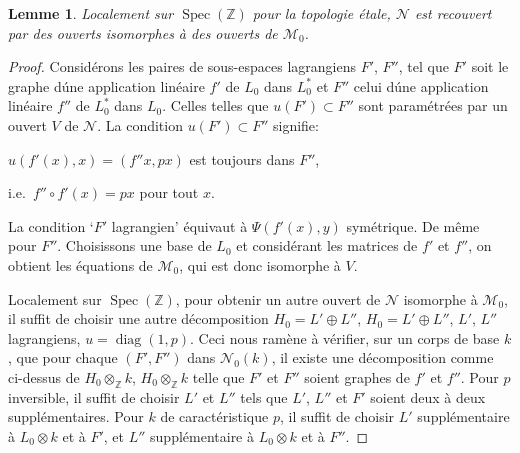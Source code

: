 \documentclass[11pt,a4paper]{article}
\theoremstyle{plain}
\newtheorem{lemma}[theorem]{Lemme}
\theoremstyle{definition}
\DeclareMathOperator{\Spec}{Spec}
\DeclareMathOperator{\diag}{diag}
\begin{document}
\begin{lemma}
Localement sur $\Spec(\mathbb{Z})$ pour la topologie \'etale, $\mathscr{N}$ est recouvert
par des ouverts isomorphes \`a des ouverts de $\mathscr{M}_0$.
\end{lemma}

\begin{proof}
Consid\'erons les paires de sous-espaces lagrangiens $F'$, $F''$, tel que $F'$
soit le graphe d\'une application lin\'eaire $f'$ de $L_0$ dans $L_0^*$ et $F''$ celui d\'une
application lin\'eaire $f''$ de $L_0^*$ dans $L_0$. Celles telles que $u(F') \subset F''$ sont
param\'etr\'ees par un ouvert $V$ de $\mathscr{N}$. La condition $u(F') \subset F''$ signifie:

$u(f'(x), x) = (f''x, px)$ est toujours dans $F''$,

i.e.~$f'' \circ f'(x) = px$ pour tout $x$.

La condition `$F'$ lagrangien' \'equivaut \`a $\Psi(f'(x), y)$ sym\'etrique. De m\^eme
pour $F''$. Choisissons une base de $L_0$ et consid\'erant les matrices de $f'$ et $f''$, on
obtient les \'equations de $\mathscr{M}_0$, qui est donc isomorphe \`a $V$.

Localement sur $\Spec(\mathbb{Z})$, pour obtenir un autre ouvert de $\mathscr{N}$ isomorphe \`a
$\mathscr{M}_0$, il suffit de choisir une autre d\'ecomposition $H_0 = L' \oplus L''$, $H_0 = L' \oplus L''$,
$L'$, $L''$ lagrangiens, $u = \diag(1, p)$. Ceci nous ram\`ene \`a v\'erifier, sur un corps de
base $k$, que pour chaque $(F', F'')$ dans $\mathscr{N}_0(k)$, il existe une d\'ecomposition
comme ci-dessus de $H_0 \otimes_\mathbb{Z} k$, $H_0 \otimes_\mathbb{Z} k$ telle que $F'$ et $F''$ soient graphes de $f'$ et
$f''$. Pour $p$ inversible, il suffit de choisir $L'$ et $L''$ tels que $L'$, $L''$ et $F'$ soient
deux \`a deux suppl\'ementaires. Pour $k$ de caract\'eristique $p$, il suffit de choisir $L'$
suppl\'ementaire \`a $L_0 \otimes k$ et \`a $F'$, et $L''$ suppl\'ementaire \`a $L_0 \otimes k$ et \`a $F''$.
\end{proof}
\end{document}
